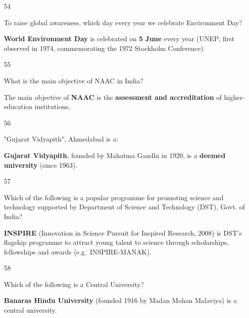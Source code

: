 \begin{question}{54}
{To raise global awareness, which day every year we celebrate Environment Day?\par}
\begin{explain}
\textbf{World Environment Day} is celebrated on \textbf{5 June} every year (UNEP; first observed in 1974, commemorating the 1972 Stockholm Conference).
\end{explain}
\end{question}

\begin{question}{55}
{What is the main objective of NAAC in India?\par}
\begin{explain}
The main objective of \textbf{NAAC} is the \textbf{assessment and accreditation} of higher-education institutions.
\end{explain}
\end{question}

\begin{question}{56}
{"Gujarat Vidyapith", Ahmedabad is a:\par}
\begin{explain}
\textbf{Gujarat Vidyapith}, founded by Mahatma Gandhi in 1920, is a \textbf{deemed university} (since 1963).
\end{explain}
\end{question}

\begin{question}{57}
{Which of the following is a popular programme for promoting science and technology supported by Department of Science and Technology (DST), Govt. of India?\par}
\begin{explain}
\textbf{INSPIRE} (Innovation in Science Pursuit for Inspired Research, 2008) is DST's flagship programme to attract young talent to science through scholarships, fellowships and awards (e.g.\ INSPIRE-MANAK).
\end{explain}
\end{question}

\begin{question}{58}
{Which of the following is a Central University?\par}
\begin{explain}
\textbf{Banaras Hindu University} (founded 1916 by Madan Mohan Malaviya) is a central university.
\end{explain}
\end{question}

